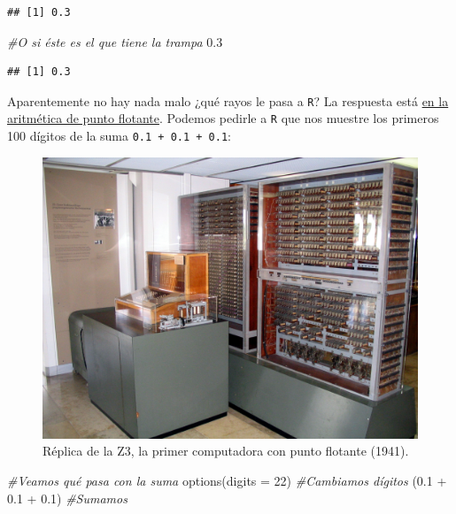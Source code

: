 \documentclass[
]{book}
\newenvironment{Shaded}{\begin{snugshade}}{\end{snugshade}}
\newcommand{\AttributeTok}[1]{\textcolor[rgb]{0.77,0.63,0.00}{#1}}
\newcommand{\CommentTok}[1]{\textcolor[rgb]{0.56,0.35,0.01}{\textit{#1}}}
\newcommand{\DecValTok}[1]{\textcolor[rgb]{0.00,0.00,0.81}{#1}}
\newcommand{\FloatTok}[1]{\textcolor[rgb]{0.00,0.00,0.81}{#1}}
\newcommand{\FunctionTok}[1]{\textcolor[rgb]{0.00,0.00,0.00}{#1}}
\newcommand{\NormalTok}[1]{#1}
\newcommand{\SpecialCharTok}[1]{\textcolor[rgb]{0.00,0.00,0.00}{#1}}
\begin{document}
\begin{verbatim}
## [1] 0.3
\end{verbatim}

\begin{Shaded}
\begin{Highlighting}[]
\CommentTok{\#O si éste es el que tiene la trampa}
\FloatTok{0.3}
\end{Highlighting}
\end{Shaded}

\begin{verbatim}
## [1] 0.3
\end{verbatim}

Aparentemente no hay nada malo ¿qué rayos le pasa a \texttt{R}? La respuesta está \href{https://www.youtube.com/watch?v=PZRI1IfStY0}{en la aritmética de punto flotante}. Podemos pedirle a \texttt{R} que nos muestre los primeros 100 dígitos de la suma \texttt{0.1\ +\ 0.1\ +\ 0.1}:

\begin{figure}

{\centering \includegraphics[width=22.22in]{images/Z3_Deutsches_Museum} 

}

\caption{Réplica de la Z3, la primer computadora con punto flotante (1941).}\label{fig:unnamed-chunk-267}
\end{figure}

\begin{Shaded}
\begin{Highlighting}[]
\CommentTok{\#Veamos qué pasa con la suma}
\FunctionTok{options}\NormalTok{(}\AttributeTok{digits =} \DecValTok{22}\NormalTok{) }\CommentTok{\#Cambiamos dígitos}
\NormalTok{(}\FloatTok{0.1} \SpecialCharTok{+} \FloatTok{0.1} \SpecialCharTok{+} \FloatTok{0.1}\NormalTok{)    }\CommentTok{\#Sumamos}
\end{Highlighting}
\end{Shaded}
\end{document}

